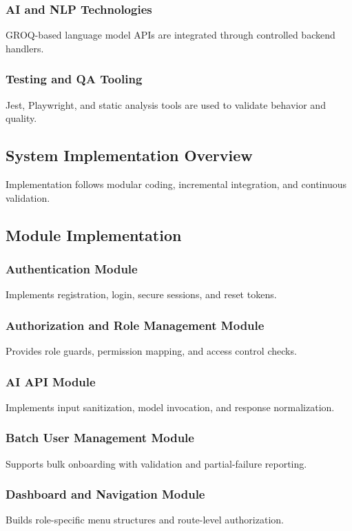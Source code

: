 \documentclass[12pt,a4paper]{article}
\begin{document}
\subsubsection{AI and NLP Technologies}
GROQ-based language model APIs are integrated through controlled backend handlers.

\subsubsection{Testing and QA Tooling}
Jest, Playwright, and static analysis tools are used to validate behavior and quality.

\subsection{System Implementation Overview}
Implementation follows modular coding, incremental integration, and continuous validation.

\subsection{Module Implementation}

\subsubsection{Authentication Module}
Implements registration, login, secure sessions, and reset tokens.

\subsubsection{Authorization and Role Management Module}
Provides role guards, permission mapping, and access control checks.

\subsubsection{AI API Module}
Implements input sanitization, model invocation, and response normalization.

\subsubsection{Batch User Management Module}
Supports bulk onboarding with validation and partial-failure reporting.

\subsubsection{Dashboard and Navigation Module}
Builds role-specific menu structures and route-level authorization.
\end{document}
